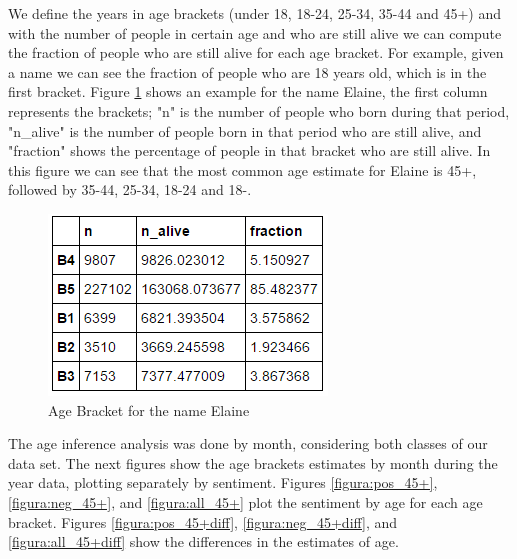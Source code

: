 \documentclass{sig-alternate}
\begin{document}
We define the years in age brackets (under 18, 18-24, 25-34, 35-44 and 45+) and with the number of people in certain age and who are still alive we can compute the fraction of people who are still alive for each age bracket. For example, given a name we can see the fraction of people who are 18 years old, which is in the first bracket. Figure \ref{figura:age_bracket} shows an example for the name Elaine, the first column represents the brackets; "n" is the number of people who born during that period, "n\_alive" is the number of people born in that period who are still alive, and "fraction" shows the percentage of people in that bracket who are still alive. In this figure we can see that the most common age estimate for Elaine is 45+, followed by 35-44, 25-34, 18-24 and 18-.


\begin{figure}[t]
\includegraphics[width=\columnwidth]{elaine.PNG}
\centering
\caption{Age Bracket for the name Elaine}
\label{figura:age_bracket}
\end{figure}

The age inference analysis was done by month, considering both classes of our data set. The next figures show the age brackets estimates by month during the year data, plotting separately by sentiment. Figures \ref{figura:pos_45+}, \ref{figura:neg_45+}, and \ref{figura:all_45+} plot the sentiment by age for each age bracket. Figures \ref{figura:pos_45+diff}, \ref{figura:neg_45+diff}, and \ref{figura:all_45+diff} show the differences in the estimates of age. 
\end{document}
